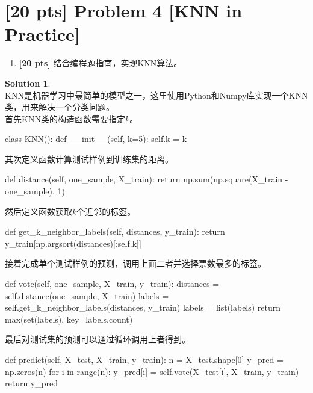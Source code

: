 \documentclass[a4paper,UTF8]{article}
\theoremstyle{definition}
\newtheorem*{solution}{Solution}
\begin{document}
	




\section*{[20 pts] Problem 4 [KNN in Practice]}

\par 
\begin{enumerate}[(1)]
	\item \textbf{[20 pts]} 结合编程题指南，实现KNN算法。

\end{enumerate}

\begin{solution}
	~\\
	KNN是机器学习中最简单的模型之一，这里使用Python和Numpy库实现一个KNN类，用来解决一个分类问题。\\
	首先KNN类的构造函数需要指定$k$。
\begin{python}
class KNN():
	def __init__(self, k=5):
		self.k = k
\end{python}
	其次定义函数计算测试样例到训练集的距离。
\begin{python}
def distance(self, one_sample, X_train):
	return np.sum(np.square(X_train - one_sample), 1)		
\end{python}
	然后定义函数获取$k$个近邻的标签。
\begin{python}
def get_k_neighbor_labels(self, distances, y_train):
	return y_train[np.argsort(distances)[:self.k]]
\end{python}
	接着完成单个测试样例的预测，调用上面二者并选择票数最多的标签。
\begin{python}
def vote(self, one_sample, X_train, y_train):
	distances = self.distance(one_sample, X_train)
	labels = self.get_k_neighbor_labels(distances, y_train)
	labels = list(labels)
	return max(set(labels), key=labels.count)
\end{python}
	最后对测试集的预测可以通过循环调用上者得到。
\begin{python}
def predict(self, X_test, X_train, y_train):
	n = X_test.shape[0]
	y_pred = np.zeros(n)
	for i in range(n):
		y_pred[i] = self.vote(X_test[i], X_train, y_train)
	return y_pred	
\end{python}
\end{solution}
\end{document}
